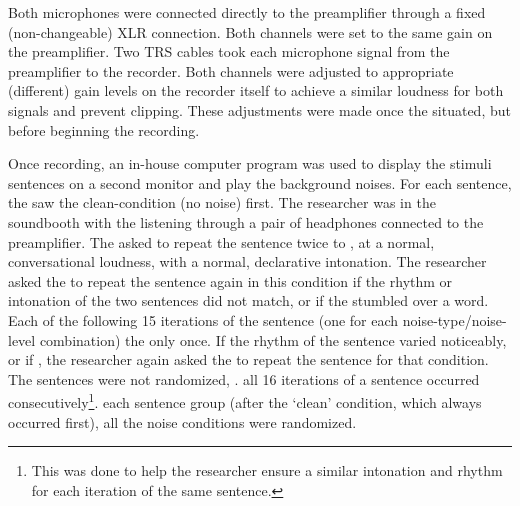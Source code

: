Both microphones were connected directly to the preamplifier through a fixed (non-changeable) XLR connection.  Both channels were set to the same gain on the preamplifier.  Two TRS cables took each microphone signal from the preamplifier to the recorder.  Both channels were adjusted to appropriate (different) gain levels on the recorder itself to achieve a similar loudness for both signals and prevent clipping.  These adjustments were made once the \DIFdelbegin {}\DIFdelend \DIFaddbegin {}\DIFaddend situated, but before beginning the recording.

Once recording, an in-house computer program was used to display the stimuli sentences on a second monitor and \DIFaddbegin {}\DIFaddend play the background noises.  For each sentence, the \DIFdelbegin {}\DIFdelend \DIFaddbegin {}\DIFaddend saw the clean-condition (no noise) first.  The researcher was in the soundbooth with the \DIFdelbegin {}\DIFdelend \DIFaddbegin {}\DIFaddend listening through a pair of headphones connected to the preamplifier.  The \DIFdelbegin {}\DIFdelend \DIFaddbegin {}\DIFaddend asked to repeat the sentence twice to \DIFdelbegin {}\DIFdelend \DIFaddbegin {}\DIFaddend , at a normal, conversational loudness, with a normal, declarative intonation.  The researcher asked the \DIFdelbegin {}\DIFdelend \DIFaddbegin {}\DIFaddend to repeat the sentence again in this condition if the rhythm or intonation of the two sentences did not match, or if the \DIFdelbegin {}\DIFdelend \DIFaddbegin {}\DIFaddend stumbled over a word.  Each of the following 15 iterations of the sentence (one for each noise-type/noise-level combination) the \DIFdelbegin {}\DIFdelend \DIFaddbegin {}\DIFaddend only once.  \DIFaddbegin {}\DIFaddend If the rhythm of the \DIFaddbegin {}\DIFaddend sentence varied noticeably, or if \DIFdelbegin {}\DIFdelend \DIFaddbegin {}\DIFaddend , the researcher again asked the \DIFdelbegin {}\DIFdelend \DIFaddbegin {}\DIFaddend to repeat the sentence for that condition.  The sentences were not randomized, \DIFdelbegin {}\DIFdelend \DIFaddbegin {}\DIFaddend . all 16 iterations of a sentence occurred consecutively\footnote{This was done to help the researcher ensure a similar intonation and rhythm for each iteration of the same sentence.}. \DIFdelbegin {}\DIFdelend \DIFaddbegin \textit{} \DIFaddend each sentence group (after the `clean' condition, which always occurred first), all the noise conditions were randomized. \DIFdelbegin {}\DIFdelend \DIFaddbegin 